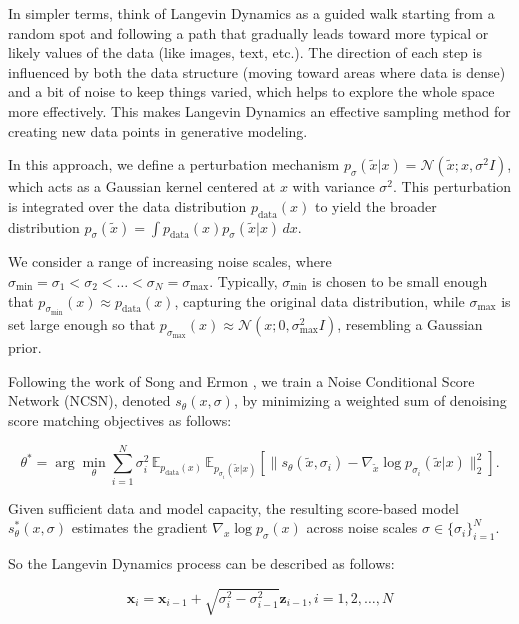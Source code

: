 In simpler terms, think of Langevin Dynamics as a guided walk starting from a random spot and following a path that gradually leads toward more typical or likely values of the data (like images, text, etc.). The direction of each step is influenced by both the data structure (moving toward areas where data is dense) and a bit of noise to keep things varied, which helps to explore the whole space more effectively. This makes Langevin Dynamics an effective sampling method for creating new data points in generative modeling.

In this approach, we define a perturbation mechanism \( p_\sigma(\tilde{x} | x) = \mathcal{N}(\tilde{x}; x, \sigma^2 I) \), which acts as a Gaussian kernel centered at \( x \) with variance \( \sigma^2 \). This perturbation is integrated over the data distribution \( p_{\text{data}}(x) \) to yield the broader distribution \( p_\sigma(\tilde{x}) = \int p_{\text{data}}(x) p_\sigma(\tilde{x} | x) \, dx \). 

We consider a range of increasing noise scales, where \( \sigma_{\min} = \sigma_1 < \sigma_2 < \dots < \sigma_N = \sigma_{\max} \). Typically, \( \sigma_{\min} \) is chosen to be small enough that \( p_{\sigma_{\min}}(x) \approx p_{\text{data}}(x) \), capturing the original data distribution, while \( \sigma_{\max} \) is set large enough so that \( p_{\sigma_{\max}}(x) \approx \mathcal{N}(x; 0, \sigma_{\max}^2 I) \), resembling a Gaussian prior.

Following the work of Song and Ermon \cite{song_generative_2020}, we train a Noise Conditional Score Network (NCSN), denoted \( s_\theta(x, \sigma) \), by minimizing a weighted sum of denoising score matching objectives as follows:

\begin{equation}
\theta^* = \arg \min_{\theta} \sum_{i=1}^{N} \sigma_i^2 \, \mathbb{E}_{p_{\text{data}}(x)} \, \mathbb{E}_{p_{\sigma_i}(\tilde{x} | x)} \left[ \| s_\theta(\tilde{x}, \sigma_i) - \nabla_{\tilde{x}} \log p_{\sigma_i}(\tilde{x} | x) \|_2^2 \right].
\end{equation}

Given sufficient data and model capacity, the resulting score-based model \( s_\theta^*(x, \sigma) \) estimates the gradient \( \nabla_x \log p_{\sigma}(x) \) across noise scales \( \sigma \in \{\sigma_i\}_{i=1}^{N} \).

So the Langevin Dynamics process can be described as follows:

\begin{equation}
\mathbf{x}_i = \mathbf{x}_{i-1} + \sqrt{\sigma_{i}^2 - \sigma_{i-1}^2} \mathbf{z}_{i-1} , i = 1, 2, \dots, N
\end{equation}



